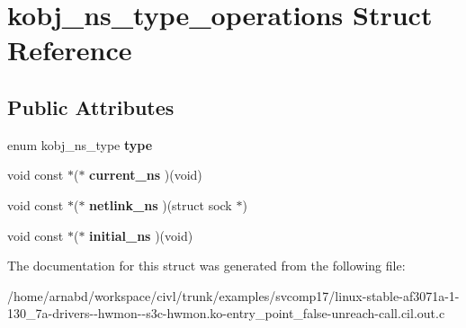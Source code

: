 \hypertarget{structkobj__ns__type__operations}{}\section{kobj\+\_\+ns\+\_\+type\+\_\+operations Struct Reference}
\label{structkobj__ns__type__operations}
\subsection*{Public Attributes}
\begin{DoxyCompactItemize}
\item 
\hypertarget{structkobj__ns__type__operations_a6059d292250b4b7a9601749eb4b6ae02}{}enum kobj\+\_\+ns\+\_\+type {\bfseries type}\label{structkobj__ns__type__operations_a6059d292250b4b7a9601749eb4b6ae02}

\item 
\hypertarget{structkobj__ns__type__operations_a69d59fb4e1585830bc5e372783da81f3}{}void const $\ast$($\ast$ {\bfseries current\+\_\+ns} )(void)\label{structkobj__ns__type__operations_a69d59fb4e1585830bc5e372783da81f3}

\item 
\hypertarget{structkobj__ns__type__operations_a7d8155df5d637834d4aaf3378cc49f0b}{}void const $\ast$($\ast$ {\bfseries netlink\+\_\+ns} )(struct sock $\ast$)\label{structkobj__ns__type__operations_a7d8155df5d637834d4aaf3378cc49f0b}

\item 
\hypertarget{structkobj__ns__type__operations_a93b1b2b173a71f5ac22933df384de31f}{}void const $\ast$($\ast$ {\bfseries initial\+\_\+ns} )(void)\label{structkobj__ns__type__operations_a93b1b2b173a71f5ac22933df384de31f}

\end{DoxyCompactItemize}


The documentation for this struct was generated from the following file\+:\begin{DoxyCompactItemize}
\item 
/home/arnabd/workspace/civl/trunk/examples/svcomp17/linux-\/stable-\/af3071a-\/1-\/130\+\_\+7a-\/drivers-\/-\/hwmon-\/-\/s3c-\/hwmon.\+ko-\/entry\+\_\+point\+\_\+false-\/unreach-\/call.\+cil.\+out.\+c\end{DoxyCompactItemize}
